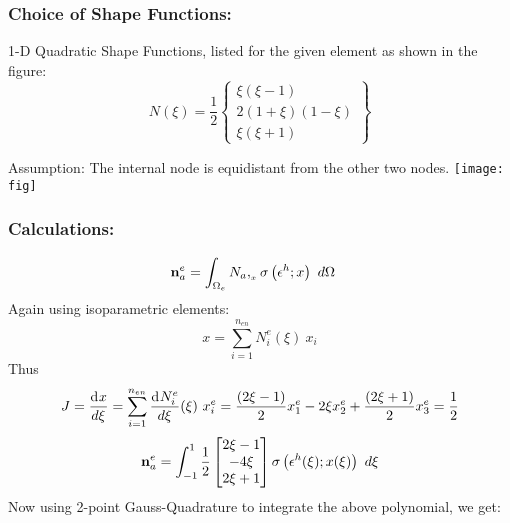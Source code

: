 \documentclass[11pt]{article}
\newcommand{\dv}[3]{\frac{{\rm d}^{#1}{#2}}{d{#3}^{#1}}}
\begin{document}
\subsubsection*{Choice of Shape Functions:}
1-D Quadratic Shape Functions, listed for the given element as shown in the figure:
\[
N\left( \xi \right) = \frac{1}{2}
\begin{Bmatrix}
\xi (\xi -1 )  \\
2 (1+\xi) (1-\xi)\\
\xi (\xi+1)
\end{Bmatrix}
\]
\begin{center}
Assumption: The internal node is equidistant from the other two nodes. 
\texttt{[image: fig]}
\end{center}
\newpage
\subsubsection*{Calculations: }
\begin{align}
{\bf n}^e_a 
& =
\int_{\Omega_e}
N_a,_{_x} \sigma \left(\epsilon^h; x \right)\ d\Omega 
\end{align}
Again using isoparametric elements: 
\[
{x} = \sum_{i=1}^{n_{en}} N^e_i (\xi) \ x_i
\]
Thus 
\[
J = \dv{}{x}{\xi} = \sum_{i=1}^{n_{en}} \dv{}{N^e_i}{\xi} (\xi) \ x^e_i = \frac{(2\xi -1)}{2}x^e_1 -2\xi x^e_2 + \frac{(2\xi + 1)}{2}x^e_3 =  \frac{1}{2}
\]
\begin{align*}
{\bf n}^e_a 
=
\int_{-1}^{1} \frac{1}{2}
\begin{bmatrix}
2\xi - 1 \\ -4\xi \\ 2\xi+1
\end{bmatrix} \sigma \left(\epsilon^h(\xi); x(\xi) \right)\ d\xi
\end{align*}
Now using 2-point Gauss-Quadrature to integrate the above polynomial, we get: 
\end{document}

